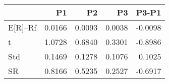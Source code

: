 \begin{tabular}{lrrrr}
\toprule
 & P1 & P2 & P3 & P3-P1 \\
\midrule
E[R]--Rf & 0.0166 & 0.0093 & 0.0038 & -0.0098 \\
t & 1.0728 & 0.6840 & 0.3301 & -0.8986 \\
Std & 0.1469 & 0.1278 & 0.1076 & 0.1025 \\
SR & 0.8166 & 0.5235 & 0.2527 & -0.6917 \\
\bottomrule
\end{tabular}
